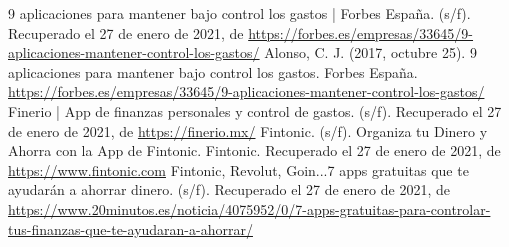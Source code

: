 \documentclass[11pt]{article}
\begin{document}
\newpage
	\begin{thebibliography}{X}
	
		 9 aplicaciones para mantener bajo control los gastos | Forbes España. (s/f). Recuperado el 27 de enero de 2021, de \url{https://forbes.es/empresas/33645/9-aplicaciones-mantener-control-los-gastos/}
		 Alonso, C. J. (2017, octubre 25). 9 aplicaciones para mantener bajo control los gastos. Forbes España. \url{https://forbes.es/empresas/33645/9-aplicaciones-mantener-control-los-gastos/}
		 Finerio | App de finanzas personales y control de gastos. (s/f). Recuperado el 27 de enero de 2021, de \url{https://finerio.mx/}
		 Fintonic. (s/f). Organiza tu Dinero y Ahorra con la App de Fintonic. Fintonic. Recuperado el 27 de enero de 2021, de \url{https://www.fintonic.com}
		 Fintonic, Revolut, Goin...7 apps gratuitas que te ayudarán a ahorrar dinero. (s/f). Recuperado el 27 de enero de 2021, de \url{https://www.20minutos.es/noticia/4075952/0/7-apps-gratuitas-para-controlar-tus-finanzas-que-te-ayudaran-a-ahorrar/}
		
	\end{thebibliography}
\end{document}
